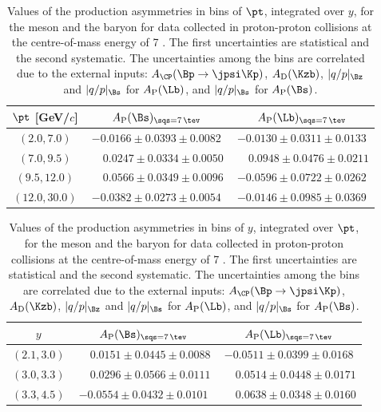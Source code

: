 \begin{table}
\caption{Values of the production asymmetries in bins of $\pt$, integrated over $y$, for the \Bs meson and the \Lb baryon for data collected in proton-proton collisions at the centre-of-mass energy of 7 \tev. The first uncertainties are statistical and the second systematic. The uncertainties among the bins are correlated due to the external inputs: $A_{\CP}(\Bp\to\jpsi\Kp)$, $A_{\rm D}(\Kzb)$, $|q/p|_{\Bz}$ and $|q/p|_{\Bs}$ for $A_{\rm P}(\Lb)$, and $|q/p|_{\Bs}$ for $A_{\rm P}(\Bs)$. }
\label{tab:AP_BsLb_2011_pt}
\begin{center}
\begin{tabular}{c|c|c}
$\pt$ [GeV/$c$]& $A_{\rm P}(\Bs)_{\sqs = 7\, \tev}$ & $A_{\rm P}(\Lb)_{\sqs = 7\, \tev}$ \\
\hline
$(2.0,   7.0)$   &  $-0.0166            \pm  0.0393  \pm  0.0082$          &  $  -0.0130 \pm 0.0311 \pm 0.0133  $  \\
$(7.0,   9.5)$   &  $\phantom{-}0.0247  \pm  0.0334  \pm  0.0050$   &  $  \phantom{-} 0.0948 \pm 0.0476 \pm 0.0211  $  \\
$(9.5,   12.0)$  &  $\phantom{-}0.0566  \pm  0.0349  \pm  0.0096$  &  $  -0.0596 \pm 0.0722 \pm 0.0262  $  \\
$(12.0,  30.0)$  &  $-0.0382            \pm  0.0273  \pm  0.0054$        &  $  -0.0146 \pm 0.0985 \pm 0.0369  $  \\
\end{tabular}
\end{center}
\end{table}

\begin{table}
\caption{Values of the production asymmetries in bins of $y$, integrated over $\pt$, for the \Bs meson and the \Lb baryon for data collected in proton-proton collisions at the centre-of-mass energy of 7 \tev. The first uncertainties are statistical and the second systematic. The uncertainties among the bins are correlated due to the external inputs: $A_{\CP}(\Bp\to\jpsi\Kp)$, $A_{\rm D}(\Kzb)$, $|q/p|_{\Bz}$ and $|q/p|_{\Bs}$ for $A_{\rm P}(\Lb)$, and $|q/p|_{\Bs}$ for $A_{\rm P}(\Bs)$.}
\label{tab:AP_BsLb_2011_eta}
\begin{center}
\begin{tabular}{c|c|c}
$y$& $A_{\rm P}(\Bs)_{\sqs = 7\, \tev}$ & $A_{\rm P}(\Lb)_{\sqs = 7\, \tev}$ \\
\hline
$(2.1,  3.0)$  &  $\phantom{-}0.0151  \pm  0.0445  \pm  0.0088$  &  $  -0.0511 \pm 0.0399 \pm 0.0168  $  \\
$(3.0,  3.3)$  &  $\phantom{-}0.0296  \pm  0.0566  \pm  0.0111$  &  $  \phantom{-}0.0514 \pm 0.0448 \pm 0.0171  $  \\
$(3.3,  4.5)$  &  $-0.0554            \pm  0.0432  \pm  0.0101$  &  $  \phantom{-}0.0638 \pm 0.0348 \pm 0.0160  $  \\
\end{tabular}
\end{center}
\end{table}



